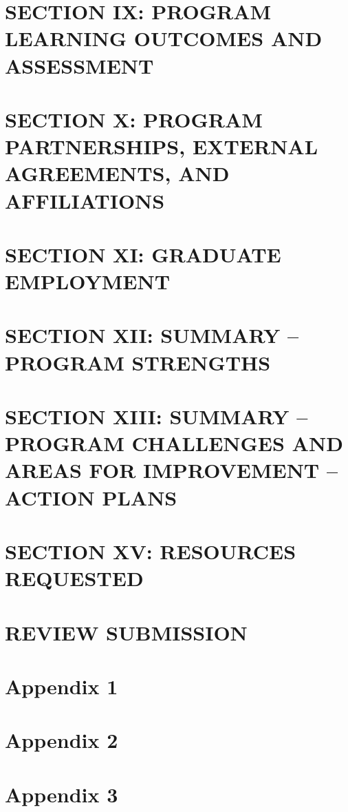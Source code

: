 \documentclass[12pt,a4paper,man,natbib,donotrepeattitle]{apa6}
\begin{document}
\section{SECTION IX: PROGRAM LEARNING OUTCOMES AND ASSESSMENT}


\section{SECTION X: PROGRAM PARTNERSHIPS, EXTERNAL AGREEMENTS, AND AFFILIATIONS}


\section{SECTION XI: GRADUATE EMPLOYMENT}


\section{SECTION XII: SUMMARY – PROGRAM STRENGTHS}


\section{SECTION XIII: SUMMARY – PROGRAM CHALLENGES AND AREAS FOR IMPROVEMENT – ACTION PLANS}


\section{SECTION XV: RESOURCES REQUESTED}


\section{REVIEW SUBMISSION}


\section{Appendix 1}


\section{Appendix 2}


\section{Appendix 3}

\end{document}
